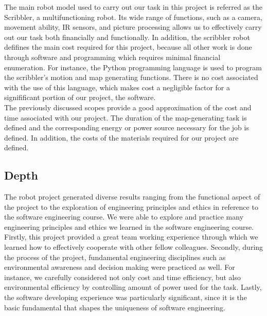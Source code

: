 \documentclass[12pt]{article}
\begin{document}
The main robot model used to carry out our task in this project is referred as the Scribbler, a multifunctioning robot. Its wide range of functions, such as a camera, movement ability, IR sensors, and picture processing allows us to effectively carry out our task both financially and functionally. In addition, the scribbler robot deﬁfines the main cost required for this project, because all other work is done through software and programming which requires minimal financial enumeration. For instance, the Python programming language is used to program the scribbler’s motion and map generating functions. There is no cost associated with the use of this language, which makes cost a negligible factor for a signiﬁficant portion of our project, the software.\\

The previously discussed scopes provide a good approximation of the cost and time associated with our project. The duration of the map-generating task is defined and the corresponding energy or power source necessary for the job is defined. In addition, the costs of the materials required for our project are defined.\\

\subsection*{\fontsize{14}{14}\textsf{Depth}}
\onehalfspacing
The robot project generated diverse results ranging from the functional aspect of the project to the exploration of engineering principles and ethics in reference to the software engineering course. We were able to explore and practice many engineering principles and ethics we learned in the software engineering course. Firstly, this project provided a great team working experience through which we learned how to effectively cooperate with other fellow colleagues. Secondly, during the process of the project, fundamental engineering disciplines such as environmental awareness and decision making were practiced as well. For instance, we carefully considered not only cost and time efficiency, but also environmental efficiency by controlling amount of power used for the task. Lastly, the software developing experience was particularly significant, since it is the basic fundamental that shapes the uniqueness of software engineering.\\
\end{document}
